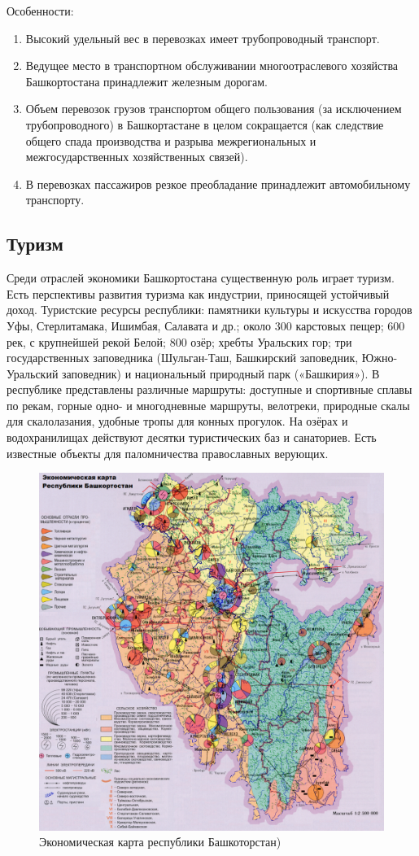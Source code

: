 Особенности:
\begin{enumerate}
\item Высокий удельный вес в перевозках имеет трубопроводный транспорт.
\item Ведущее место в транспортном обслуживании многоотраслевого хозяйства Башкортостана принадлежит железным дорогам.
\item Объем перевозок грузов транспортом общего пользования (за исключением трубопроводного) в Башкортастане в целом сокращается (как следствие общего спада производства и разрыва межрегиональных и межгосударственных хозяйственных связей).
\item В перевозках пассажиров резкое преобладание принадлежит автомобильному транспорту.
\end{enumerate}

\subsection{Туризм}

Среди отраслей экономики Башкортостана существенную роль играет туризм. Есть перспективы развития туризма как индустрии, приносящей устойчивый доход. Туристские ресурсы республики: памятники культуры и искусства городов Уфы, Стерлитамака, Ишимбая, Салавата и др.; около 300 карстовых пещер; 600 рек, с крупнейшей рекой Белой; 800 озёр; хребты Уральских гор; три государственных заповедника (Шульган-Таш, Башкирский заповедник, Южно-Уральский заповедник) и национальный природный парк («Башкирия»). В республике представлены различные маршруты: доступные и спортивные сплавы по рекам, горные одно- и многодневные маршруты, велотреки, природные скалы для скалолазания, удобные тропы для конных прогулок. На озёрах и водохранилищах действуют десятки туристических баз и санаториев. Есть известные объекты для паломничества православных верующих.

\begin{figure}[h!]
\includegraphics[width=1\linewidth]{pics/sasha/economics}
\caption{Экономическая карта республики Башкоторстан)}\label{fig:economics}
\end{figure}


